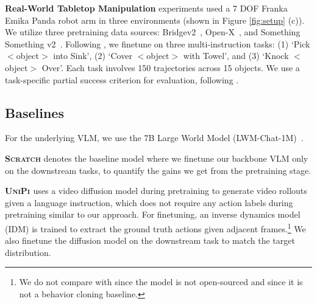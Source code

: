 \documentclass{article} %
\begin{document}
\textbf{Real-World Tabletop Manipulation} experiments used a 7 DOF Franka Emika Panda robot arm in three environments (shown in Figure \ref{fig:setup} (c)). 
We utilize three pretraining data sources: Bridgev2~\citep{walke2023bridgedata}, Open-X~\citep{open_x_embodiment_rt_x_2023}, and Something Something v2~\citep{goyal2017something}. Following \citet{kim2024OpenVLA}, we finetune on three multi-instruction tasks: (1) ‘Pick $<$object$>$ into Sink’, (2) ‘Cover $<$object$>$ with Towel’, and (3) ‘Knock $<$object$>$ Over’. Each task involves 150 trajectories across 15 objects. We use a task-specific partial success criterion for evaluation, following  \citet{kim2024OpenVLA}.

\subsection{Baselines}
For the underlying VLM, we use the 7B Large World Model (LWM-Chat-1M)~\citep{liu2024worldmodelmillionlengthvideo}. 

\textbf{\textsc{Scratch}} denotes the baseline model where we finetune our backbone VLM only on the downstream tasks, to quantify the gains we get from the pretraining stage.

\textbf{\textsc{UniPi} \citep{du2023learning}} uses a video diffusion model during pretraining to generate video rollouts given a language instruction, which does not require any action labels during pretraining similar to our approach. For finetuning, an inverse dynamics model (IDM) is trained to extract the ground truth actions given adjacent frames.\footnote{We do not compare with \citet{yang2024learning} since the model is not open-sourced and \citet{ko2024learning} since it is not a behavior cloning baseline.} We also finetune the diffusion model on the downstream task to match the target distribution.
\end{document}
